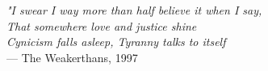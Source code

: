 \begin{flushright}
    \emph{"I swear I way more than half believe it when I say, \\
    That somewhere love and justice shine\\
    Cynicism falls asleep, Tyranny talks to itself} \\
    — The Weakerthans, 1997
\end{flushright}